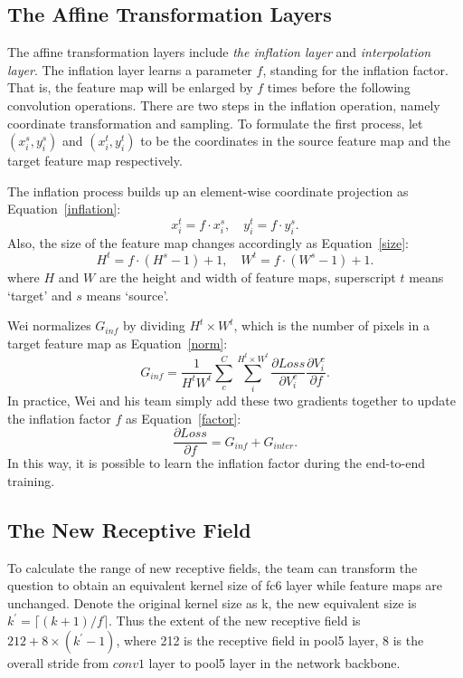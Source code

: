 \documentclass[10pt,twocolumn,letterpaper]{article}
\begin{document}
\subsection{The Affine Transformation Layers}

The affine transformation layers include \emph{the inflation layer} and \emph{interpolation layer}. The inflation layer learns a parameter $f$, standing for the inflation factor. That is, the feature map will be enlarged by $f$ times before the following convolution operations. There are two steps in the inflation operation, namely coordinate transformation and sampling. To formulate the first process, let $(x_i^s,y_i^s)$ and $(x_i^t,y_i^t)$ to be the coordinates in the source feature map and the target feature map respectively. 

The inflation process builds up an element-wise coordinate projection as Equation~\ref{inflation}:
\begin{equation}
x_i^t=f\cdot x_i^s,\quad y_i^t=f\cdot y_i^s.   \label{inflation}
\end{equation}
Also, the size of the feature map changes accordingly as Equation~\ref{size}:
\begin{equation}
H^t=f\cdot (H^s-1)+1,\quad W^t=f\cdot (W^s-1)+1.   \label{size}
\end{equation}
where $H$ and $W$ are the height and width of feature maps, superscript $t$ means `target' and $s$ means `source'.

Wei normalizes $G_{inf}$ by dividing $H^t\times W^t$, which is the number of pixels in a target feature map as Equation~\ref{norm}:
\begin{equation}
G_{inf}=\frac{1}{H^tW^t}\sum_{c}^{C}\sum_{i}^{H^t\times W^t}\frac{\partial Loss}{\partial V_i^c}\frac{\partial V_i^c}{\partial f} .   \label{norm}
\end{equation}
In practice, Wei and his team simply add these two gradients together to update the inflation factor $f$ as Equation~\ref{factor}:
\begin{equation}
\frac{\partial Loss}{\partial f}=G_{inf}+G_{inter}.   \label{factor}
\end{equation}
In this way, it is possible to learn the inflation factor during the end-to-end training.


\subsection{The New Receptive Field}

To calculate the range of new receptive fields, the team can transform the question to obtain an equivalent kernel size of fc6 layer while feature maps are unchanged. Denote the original kernel size as k, the new equivalent size is $k^\prime =\lceil(k + 1)/f \rceil$. Thus the extent of the new receptive field is $212 + 8 × (k^\prime − 1)$, where 212 is the receptive field in pool5 layer, 8 is the overall stride from $conv1$ layer to pool5 layer in the network backbone.
\end{document}
